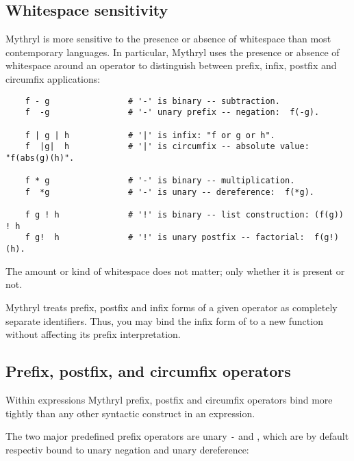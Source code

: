 
\subsection{Whitespace sensitivity}
\label{section:ref:expressions:whitespace-sensitivity}

Mythryl is more sensitive to the presence or absence of 
whitespace than most contemporary languages.  In particular, 
Mythryl uses the presence or absence of whitespace around 
an operator to distinguish between prefix, infix, postfix 
and circumfix applications:

\begin{verbatim}
    f - g                # '-' is binary -- subtraction.
    f  -g                # '-' unary prefix -- negation:  f(-g).

    f | g | h            # '|' is infix: "f or g or h".
    f  |g|  h            # '|' is circumfix -- absolute value: "f(abs(g)(h)".

    f * g                # '-' is binary -- multiplication.
    f  *g                # '-' is unary -- dereference:  f(*g).

    f g ! h              # '!' is binary -- list construction: (f(g)) ! h
    f g!  h              # '!' is unary postfix -- factorial:  f(g!)(h).
\end{verbatim}

The amount or kind of whitespace does not matter;  only whether it is present or not.

Mythryl treats prefix, postfix and infix forms of a given operator 
as completely separate identifiers.  Thus, you may bind the infix 
form of {\tt *} to a new function without affecting its prefix 
interpretation.

\cutend*


\subsection{Prefix, postfix, and circumfix operators}
\label{section:ref:expressions:prefix-postfix-and-circumfix-operators}

Within expressions Mythryl prefix, postfix and circumfix operators 
bind more tightly than any other syntactic construct in an expression.

The two major predefined prefix operators are unary {\tt -} and {\tt *}, 
which are by default respectiv bound to unary negation and unary 
dereference:

